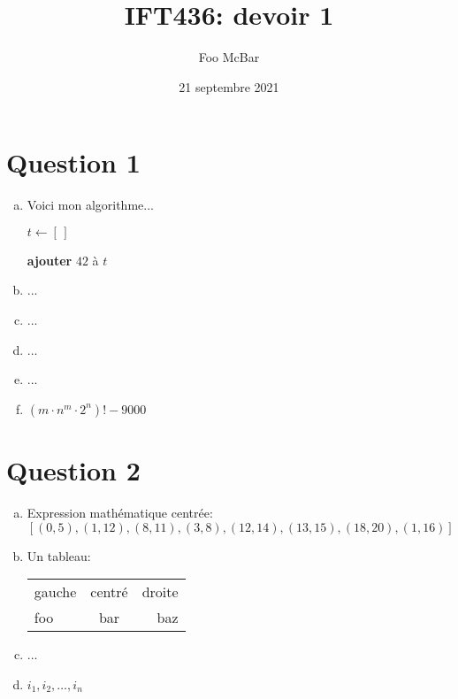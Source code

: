 \documentclass{article}
\title{IFT436: devoir 1}
\author{Foo McBar}
\date{21 septembre 2021}
\begin{document}
\maketitle

\section*{Question 1}

\begin{enumerate}[(a)]

\item Voici mon algorithme...

    \begin{algorithm}[H]
      \DontPrintSemicolon


      $t \leftarrow [\,]$\;


      \textbf{ajouter} $42$ à $t$\;
    \end{algorithm}

\item ...

\item ...

\item ...

\item ...

\item $(m \cdot n^m \cdot 2^n)! - 9000$

\end{enumerate}

\section*{Question 2}

\begin{enumerate}[(a)]

\item Expression mathématique centrée: \[ [(0, 5), (1, 12), (8, 11),
  (3, 8), (12, 14), (13, 15), (18, 20), (1, 16)] \]

\item Un tableau:

  \begin{center}
    \begin{tabular}{lcr}
      gauche & centré & droite \\

      foo & bar & baz
    \end{tabular}
  \end{center}

\item ...

\item $i_1, i_2, \ldots, i_n$

\end{enumerate}
\end{document}
